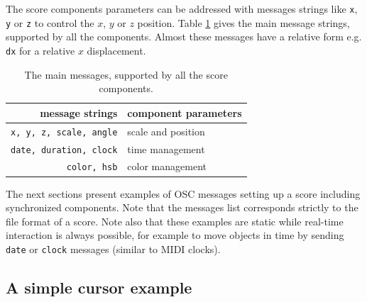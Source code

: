 \documentclass{article}
\newcommand{\osc}[1]			{{\small \texttt{#1}}}
\begin{document}
The score components parameters can be addressed with messages strings like \osc{x}, \osc{y} or \osc{z} to control the $x$, $y$ or $z$ position. Table \ref{msgtable} gives the main message strings, supported by all the components. Almost these messages have a relative form e.g. \osc{dx} for a relative $x$ displacement.

\begin{table}[htdp]
\begin{center}
\begin{tabular}{|r|l|}
\hline
message strings & component parameters \\
\hline
\osc{x, y, z, scale, angle}		&  scale and position \\
\osc{date, duration, clock}		&  time management \\
\osc{color, hsb}		&  color management \\
\hline
\end{tabular}
\end{center}
\caption{The main messages, supported by all the score components.}
\label{msgtable}
\end{table}

The next sections present examples of OSC messages setting up a score including synchronized components. Note that the messages list corresponds strictly to the file format of a score. Note also that these examples are static while real-time interaction is always possible, for example to move objects in time by sending \osc{date} or \osc{clock} messages (similar to MIDI clocks).

\subsection{A simple cursor example}
\end{document}
